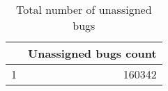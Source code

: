 \begin{table}[ht]
\begin{center}
\begin{tabular}{rr}
  \hline
 & Unassigned bugs count \\ 
  \hline
1 & 160342 \\ 
   \hline
\end{tabular}
\caption{Total number of unassigned bugs}
\end{center}
\end{table}
